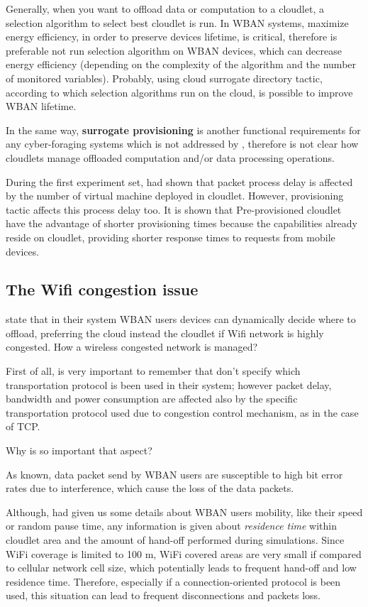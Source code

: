 \documentclass[sigchi]{acmart}
\begin{document}
Generally, when you want to offload data or computation to a cloudlet, a selection algorithm to select best cloudlet is run. In WBAN systems, maximize energy efficiency, in order to preserve devices lifetime, is critical, therefore is preferable not run selection algorithm on WBAN devices, which can decrease energy efficiency (depending on the complexity of the algorithm and the number of monitored variables). Probably, using cloud surrogate directory tactic, according to which selection algorithms run on the cloud, is possible to improve WBAN lifetime. \cite{DecisionModel}

In the same way, \textbf{surrogate provisioning} is another functional requirements for any cyber-foraging systems which is not addressed by \citep{MSAReport}, therefore is not clear how cloudlets manage offloaded computation and/or data processing operations.

During the first experiment set, \citet{MSAReport} had shown that packet process delay is affected by the number of virtual machine deployed in cloudlet. However, provisioning tactic affects this process delay too. It is shown that Pre-provisioned cloudlet have the advantage of shorter provisioning times because the capabilities already reside on cloudlet, providing shorter response times to requests from mobile devices.\cite{DecisionModel}

\subsection{The Wifi congestion issue}

\citet{MSAReport} state that in their system WBAN users devices can dynamically decide where to offload, preferring the cloud instead the cloudlet if Wifi network is highly congested. How a wireless congested network is managed?

First of all, is very important to remember that \citet{MSAReport} don't specify which transportation protocol is been used in their system; however packet delay, bandwidth and power consumption are affected also by the specific transportation protocol used due to congestion control mechanism, as in the case of TCP.

Why is so important that aspect?

As known, data packet send by WBAN users are susceptible to high bit error rates due to interference, which cause the loss of the data packets.  

Although, \cite{MSAReport} had given us some details about WBAN users mobility, like their speed or random pause time, any information is given about \textit{residence time} within cloudlet area and the amount of hand-off performed during simulations. Since WiFi coverage is limited to 100 m, WiFi covered areas are very small if compared to cellular network cell size, which potentially leads to frequent hand-off and low residence time. Therefore, especially if a connection-oriented protocol is been used, this situation can lead to frequent disconnections and packets loss.
\end{document}
